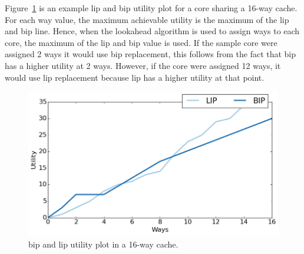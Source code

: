Figure~\ref{fig:algorithms:clu_example} is an example \gls{lip} and \gls{bip} utility plot for a core sharing a 16-way cache.
For each way value, the maximum achievable utility is the maximum of the \gls{lip} and \gls{bip} line.
Hence, when the lookahead algorithm is used to assign ways to each core, the maximum of the \gls{lip} and \gls{bip} value is used.
If the sample core were assigned 2 ways it would use \gls{bip} replacement, this follows from the fact that \gls{bip} has a higher utility at 2 ways.
However, if the core were assigned 12 ways, it would use \gls{lip} replacement because \gls{lip} has a higher utility at that point.

\begin{figure}[ht]
    \centering
    \includegraphics[width=.65\textwidth]{figures/algorithms/clu-utility}
    \caption{\gls{bip} and \gls{lip} utility plot in a 16-way cache.}
    \label{fig:algorithms:clu_example}
\end{figure}
